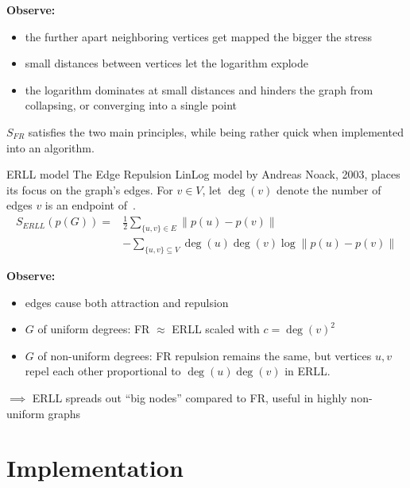 \documentclass{beamer}
\begin{document}
\begin{frame}
    \textbf{Observe:}
    \begin{itemize}
        \item the further apart neighboring vertices get mapped the bigger the stress
        \item small distances between vertices let the logarithm explode
        \item the logarithm dominates at small distances and hinders the graph from collapsing, or converging into a single point
    \end{itemize}
    $S_{FR}$ satisfies the two main principles, while being rather quick when implemented into an algorithm.
\end{frame}

\begin{frame}{ERLL model}
    The Edge Repulsion LinLog model by Andreas Noack, 2003, places its focus on the graph's edges.
    For $v \in V$, let $\deg(v)$ denote the number of edges $v$ is an endpoint of~\cite{erll_paper}.
    \begin{equation}
    \begin{split}
        S_{ERLL}(p(G)) = & \frac{1}{2} \sum_{\{u,v\} \in E}{\parallel p(u)-p(v) \parallel} \\
        & - \sum_{\{u,v \} \subseteq V}{\deg(u)\deg(v) \log\parallel p(u)-p(v) \parallel}
    \end{split}
    \end{equation}
\end{frame}

\begin{frame}
    \textbf{Observe:}
    \begin{itemize}
        \item edges cause both attraction and repulsion
        \item $G$ of uniform degrees: FR $\approx$ ERLL scaled with $c=\deg{(v)}^2$
        \item $G$ of non-uniform degrees: FR repulsion remains the same, but vertices $u,v$ repel each other proportional to $\deg(u)\deg(v)$ in ERLL.
    \end{itemize}
    $\implies$ ERLL spreads out ``big nodes'' compared to FR, useful in highly non-uniform graphs
\end{frame}
\section{Implementation}
\end{document}
